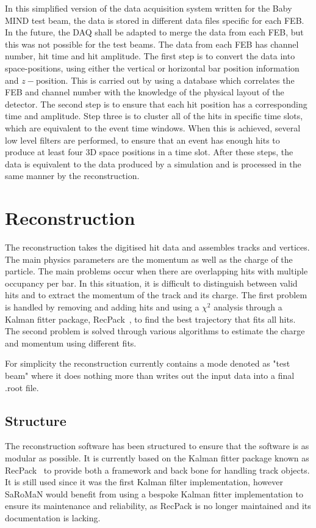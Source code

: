 In this simplified version of the data acquisition system written for the Baby MIND test beam, the data is stored in different data files specific for each FEB. In the future, the DAQ shall be adapted to merge the data from each FEB, but this was not possible for the test beams. The data from each FEB has channel number, hit time and hit amplitude. The first step is to convert the data into space-positions, using either the vertical or horizontal bar position information and $z-$position. This is carried out by using a database which correlates the FEB and channel number with the knowledge of the physical layout of the detector. The second step is to ensure that each hit position has a corresponding time and amplitude. Step three is to cluster all of the hits in specific time slots, which are equivalent to the event time windows. When this is achieved, several low level filters are performed, to ensure that an event has enough hits to produce at least four 3D space positions in a time slot. After these steps, the data is equivalent to the data produced by a simulation and is processed in the same manner by the reconstruction.%

\section{Reconstruction}\label{sec:reconstruction}
The reconstruction takes the digitised hit data and assembles tracks and vertices. The main physics parameters are the momentum as well as the charge of the particle. The main problems occur when there are overlapping hits with multiple occupancy per bar. In this situation, it is difficult to distinguish between valid hits and to extract the momentum of the track and its charge.
The first problem is handled by removing and adding hits and using a $\chi^2$ analysis through a Kalman fitter package, RecPack~\cite{RecPack}, to find the best trajectory that fits all hits. The second problem is solved through various algorithms to estimate the charge and momentum using different fits.

For simplicity the reconstruction currently contains a mode denoted as "test beam" where it does nothing more than writes out the input data into a final .root file.

\subsection{Structure}
The reconstruction software has been structured to ensure that the software is as modular as possible. It is currently based on the Kalman fitter package known as RecPack~\cite{RecPack} to provide both a framework and back bone for handling track objects. It is still used since it was the first Kalman filter implementation, however SaRoMaN would benefit from using a bespoke Kalman fitter implementation to ensure its maintenance and reliability, as RecPack is no longer maintained and its documentation is lacking. 

